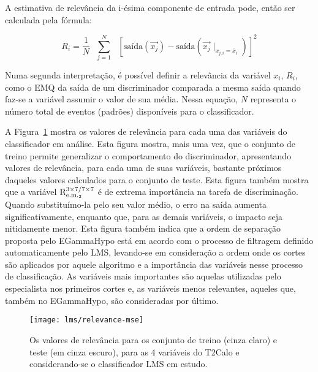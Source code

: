 A estimativa de relevância da i-ésima componente de entrada pode, então ser
calculada pela fórmula:

\begin{equation}
R_i = \frac{1}{N} \text{ } \overset{N}{\underset{j=1}{\sum}} \text{ }
[\text{saída}(\overrightarrow{x_j}) -
\text{saída}(\overrightarrow{x_j}\mid_{x_{j,i} = \overline{x}_i})]^2 
\label{eq:relevance-mse}
\end{equation}

Numa segunda interpretação, é possível definir a relevância da variável $x_i$,
$R_i$, como o EMQ da saída de um discriminador comparada a mesma saída quando
faz-se a variável assumir o valor de sua média. Nessa equação, $N$ representa
o número total de eventos (padrões) disponíveis para o classificador. 

A Figura~\ref{fig:relevance-mse} mostra os valores de relevância para cada uma
das variáveis do classificador em análise. Esta figura mostra, mais uma vez,
que o conjunto de treino permite generalizar o comportamento do discriminador,
apresentando valores de relevância, para cada uma de suas variáveis, bastante
próximos daqueles valores calculados para o conjunto de teste. Esta figura
também mostra que a variável $\text{R}^{3\times7/7\times7}_{\text{e.m.}_{2}}$ é de extrema importância na tarefa de
discriminação. Quando substituímo-la pelo seu valor médio, o erro na saída
aumenta significativamente, enquanto que, para as demais variáveis, o impacto
seja nitidamente menor. Esta figura também indica que a ordem de separação
proposta pelo EGammaHypo está em acordo com o processo de filtragem definido
automaticamente pelo LMS, levando-se em consideração a ordem onde os cortes
são aplicados por aquele algoritmo e a importância das variáveis nesse
processo de classificação. As variáveis mais importantes são aquelas
utilizadas pelo especialista nos primeiros cortes e, as variáveis menos
relevantes, aqueles que, também no EGammaHypo, são consideradas por último.

\begin{figure}
\begin{center}
\texttt{[image: lms/relevance-mse]}
\end{center}
\caption{Os valores de relevância para os conjunto de treino (cinza claro) e
teste (em cinza escuro), para as 4 variáveis do T2Calo e considerando-se o
classificador LMS em estudo.}
\label{fig:relevance-mse}
\end{figure}

